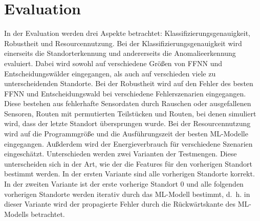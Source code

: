 \chapter{Evaluation}
In der Evaluation werden drei Aspekte betrachtet: Klassifizierungsgenauigkeit, Robustheit und Resourcennutzung.
Bei der Klassifizierungsgenauigkeit wird einerseits die Standorterkennung und andererseits die Anomalieerkennung evaluiert.
Dabei wird sowohl auf verschiedene Größen von FFNN und Entscheidungswälder eingegangen,
als auch auf verschieden viele zu unterscheidenden Standorte.
\newline
\newline
Bei der Robustheit wird auf den Fehler des besten FFNN und Entscheidungswald bei verschiedene Fehlerszenarien eingegangen.
Diese bestehen aus fehlerhafte Sensordaten durch Rauschen oder ausgefallenen Sensoren,
Routen mit permutierten Teilstücken und Routen, bei denen simuliert wird, dass der letzte Standort übersprungen wurde.
\newline
\newline
Bei der Resourcennutzung wird auf die Programmgröße und die Ausführungszeit der besten ML-Modelle eingegangen.
Außderdem wird der Energieverbrauch für verschiedene Szenarien eingeschätzt.
\newline
\newline
Unterschieden werden zwei Varianten der Testmengen.
Diese unterscheiden sich in der Art, wie der die Features für den vorherigen Standort bestimmt werden.
In der ersten Variante sind alle vorherigen Standorte korrekt.
In der zweiten Variante ist der erste vorherige Standort 0 und alle folgenden vorherigen Standorte werden iterativ durch das ML-Modell bestimmt,
d.~h. in dieser Variante wird der propagierte Fehler durch die Rückwärtskante des ML-Modells betrachtet.











